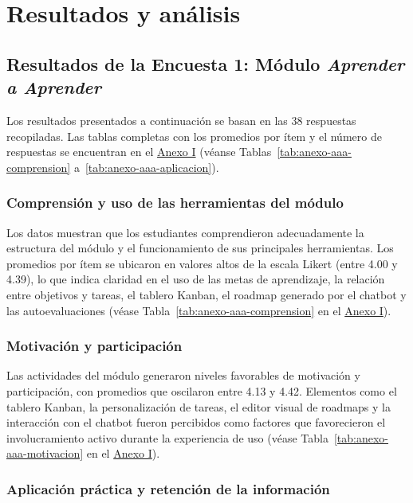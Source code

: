 \section{Resultados y análisis}

\subsection{Resultados de la Encuesta 1: Módulo \textit{Aprender a Aprender}}

Los resultados presentados a continuación se basan en las 38 respuestas recopiladas. Las tablas completas con los promedios por ítem y el número de respuestas se encuentran en el \hyperref[anexo:encuestas]{Anexo I} (véanse Tablas~\ref{tab:anexo-aaa-comprension} a~\ref{tab:anexo-aaa-aplicacion}).

\subsubsection*{Comprensión y uso de las herramientas del módulo}

Los datos muestran que los estudiantes comprendieron adecuadamente la estructura del módulo y el funcionamiento de sus principales herramientas. Los promedios por ítem se ubicaron en valores altos de la escala Likert (entre 4.00 y 4.39), lo que indica claridad en el uso de las metas de aprendizaje, la relación entre objetivos y tareas, el tablero Kanban, el roadmap generado por el chatbot y las autoevaluaciones (véase Tabla~\ref{tab:anexo-aaa-comprension} en el \hyperref[anexo:encuestas]{Anexo I}).

\subsubsection*{Motivación y participación}

Las actividades del módulo generaron niveles favorables de motivación y participación, con promedios que oscilaron entre 4.13 y 4.42. Elementos como el tablero Kanban, la personalización de tareas, el editor visual de roadmaps y la interacción con el chatbot fueron percibidos como factores que favorecieron el involucramiento activo durante la experiencia de uso (véase Tabla~\ref{tab:anexo-aaa-motivacion} en el \hyperref[anexo:encuestas]{Anexo I}).

\subsubsection*{Aplicación práctica y retención de la información}

